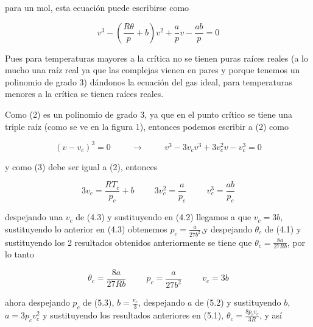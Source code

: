 \documentclass[12pt,a4paper]{article}
\begin{document}
\begin{enumerate}
    para un mol, esta ecuación puede escribirse como
    
    \begin{equation}
        v^3 - \left(\frac{R\theta}{p} + b\right) v^2 + \frac{a}{p} v - \frac{ab}{p} = 0
    \end{equation}
    
    \newpage
    
    Pues para temperaturas mayores a la crítica no se tienen puras raíces reales (a lo mucho una raíz real ya que las complejas vienen en pares y porque tenemos un polinomio de grado 3) dándonos la ecuación del gas ideal, para temperaturas menores a la crítica se tienen raíces reales.
    
    Como (2) es un polinomio de grado 3, ya que en el punto crítico se tiene una triple raíz (como se ve en la figura 1), entonces podemos escribir a (2) como
    
    \begin{equation}
        (v - v_c)^3 = 0 \hspace{1cm} \rightarrow \hspace{1cm} v^3 - 3v_c v^3 + 3v_{c}^{2}v - v_{c}^{3} = 0
    \end{equation}
    
    y como (3) debe ser igual a (2), entonces
    
    \begin{equation}
        3v_c = \frac{RT_c}{p_c} + b \hspace{1cm} 3v_{c}^{2} =\frac{a}{p_c} \hspace{1cm} v_{c}^{3} = \frac{ab}{p_c}
    \end{equation}
    
    despejando una $v_c$ de (4.3) y sustituyendo en (4.2) llegamos a que $v_c = 3b$, sustituyendo lo anterior en (4.3) obtenemos $p_c = \frac{a}{27 b^2}$,y despejando $\theta_c$ de (4.1) y sustituyendo los 2 resultados obtenidos anteriormente se tiene que $\theta_c = \frac{8a}{27Rb}$, por lo tanto
    
    \begin{equation}
        \theta_c = \frac{8a}{27Rb} \hspace{1cm} p_c = \frac{a}{27b^2} \hspace{1cm} v_c = 3b
    \end{equation}
    
    ahora despejando $p_c$ de (5.3), $b = \frac{v_c}{3}$, despejando $a$ de (5.2) y sustituyendo $b$, $a = 3p_c v_{c}^{2}$ y sustituyendo los resultados anteriores en (5.1), $\theta_c = \frac{8p_c v_c}{3R}$, y así
    

\end{enumerate}
\end{document}
